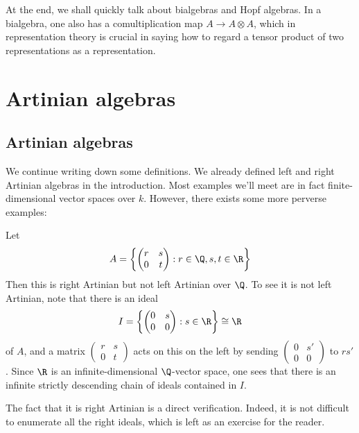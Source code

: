 \documentclass[a4paper]{article}
\begin{document}
At the end, we shall quickly talk about bialgebras and Hopf algebras. In a bialgebra, one also has a comultiplication map $A \to A \otimes A$, which in representation theory is crucial in saying how to regard a tensor product of two representations as a representation.


\section{Artinian algebras}
\subsection{Artinian algebras}
We continue writing down some definitions. We already defined left and right Artinian algebras in the introduction. Most examples we'll meet are in fact finite-dimensional vector spaces over $k$. However, there exists some more perverse examples:

\begin{eg}
  Let
  \[
    A = \left\{
      \begin{pmatrix}
        r & s\\
        0 & t
      \end{pmatrix}: r \in \Q, s, t \in \R
    \right\}
  \]
  Then this is right Artinian but not left Artinian over $\Q$. To see it is not left Artinian, note that there is an ideal
  \[
    I = \left\{
      \begin{pmatrix}
        0 & s\\
        0 & 0
      \end{pmatrix}: s \in \R
    \right\} \cong \R
  \]
  of $A$, and a matrix $\begin{pmatrix}r & s\\0 & t\end{pmatrix}$ acts on this on the left by sending $\begin{pmatrix}0 & s'\\ 0 & 0\end{pmatrix}$ to $rs'$. Since $\R$ is an infinite-dimensional $\Q$-vector space, one sees that there is an infinite strictly descending chain of ideals contained in $I$.

  The fact that it is right Artinian is a direct verification. Indeed, it is not difficult to enumerate all the right ideals, which is left as an exercise for the reader.
\end{eg}
\end{document}
